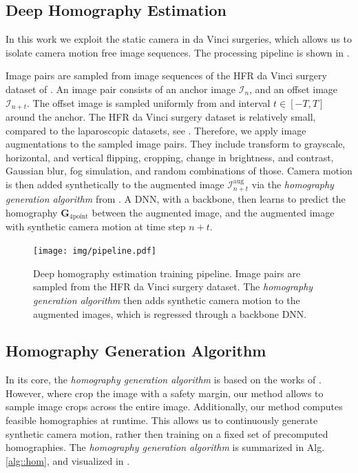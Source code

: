 \subsection{Deep Homography Estimation}

In this work we exploit the static camera in da Vinci surgeries, which allows us to isolate camera motion free image sequences. The processing pipeline is shown in .

Image pairs are sampled from image sequences of the HFR da Vinci surgery dataset of . An image pair consists of an anchor image $\mathcal{I}_n$, and an offset image $\mathcal{I}_{n+t}$. The offset image is sampled uniformly from and interval $t\in[-T,T]$ around the anchor. The HFR da Vinci surgery dataset is relatively small, compared to the laparoscopic datasets, see . Therefore, we apply image augmentations to the sampled image pairs. They include transform to grayscale, horizontal, and vertical flipping, cropping, change in brightness, and contrast, Gaussian blur, fog simulation, and random combinations of those. Camera motion is then added synthetically to the augmented image $\mathcal{I}^\text{aug}_{n+t}$ via the \textit{homography generation algorithm} from . A DNN, with a backbone, then learns to predict the homography $\mathbf{G}_{4\text{point}}$ between the augmented image, and the augmented image with synthetic camera motion at time step $n+t$.

\begin{landscape}
\begin{figure}
    \centering
    \texttt{[image: img/pipeline.pdf]}
    \caption{Deep homography estimation training pipeline. Image pairs are sampled from the HFR da Vinci surgery dataset. The \textit{homography generation algorithm} then adds synthetic camera motion to the augmented images, which is regressed through a backbone DNN.}
    \label{c3:fig:hom}
\end{figure}
\end{landscape}

\subsection{Homography Generation Algorithm}
\label{c3:sec:hom_gen}

In its core, the \textit{homography generation algorithm} is based on the works of \cite{detone2016deep}. However, where \citeauthor{detone2016deep} crop the image with a safety margin, our method allows to sample image crops across the entire image. Additionally, our method computes feasible homographies at runtime. This allows us to continuously generate synthetic camera motion, rather then training on a fixed set of precomputed homographies. The \textit{homography generation algorithm} is summarized in Alg.\,\ref{alg::hom}, and visualized in .

